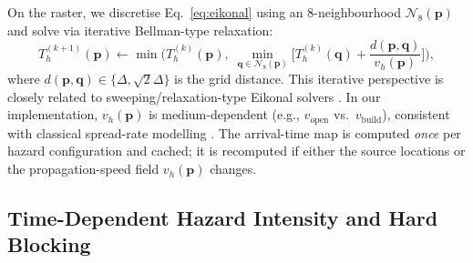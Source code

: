 \documentclass[preprint,12pt]{elsarticle}
\providecommand{\FloatBarrier}{}
\let\origsubsection\subsection
\renewcommand{\subsection}{\FloatBarrier\origsubsection}
\begin{document}
On the raster, we discretise Eq.~\eqref{eq:eikonal} using an 8-neighbourhood
$\mathcal{N}_8(\mathbf{p})$ and solve via iterative Bellman-type relaxation:
\begin{equation}
T_h^{(k+1)}(\mathbf{p}) \leftarrow \min\!\Bigg(
T_h^{(k)}(\mathbf{p}), \;
\min_{\mathbf{q} \in \mathcal{N}_8(\mathbf{p})}
\bigg[ T_h^{(k)}(\mathbf{q}) + \frac{d(\mathbf{p}, \mathbf{q})}{v_h(\mathbf{p})} \bigg]
\Bigg),
\label{eq:relax_update}
\end{equation}
where $d(\mathbf{p}, \mathbf{q}) \in \{\Delta, \sqrt{2}\Delta\}$ is the grid
distance. This iterative perspective is closely related to sweeping/relaxation-type
Eikonal solvers \citep{Zhao2005FastSweeping}. In our implementation, $v_h(\mathbf{p})$ is
medium-dependent (e.g., $v_{\mathrm{open}}$ vs.\ $v_{\mathrm{build}}$), consistent
with classical spread-rate modelling \citep{Rothermel1972}.
The arrival-time map is computed \emph{once} per hazard configuration and cached;
it is recomputed if either the source locations or the propagation-speed
field $v_h(\mathbf{p})$ changes.


\subsection{Time-Dependent Hazard Intensity and Hard Blocking}
\label{sec:hazard_intensity}
\end{document}
